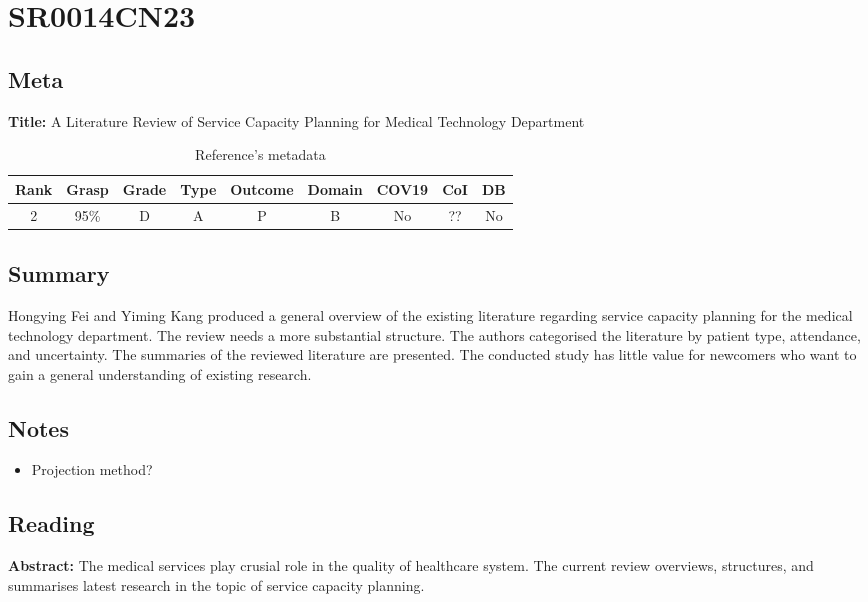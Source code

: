 \section{ SR0014CN23 }


\subsection{Meta}

    \textbf{Title:}
    A Literature Review of Service Capacity Planning for Medical Technology Department

    \begin{table}[H]
        \centering
        \begin{tabular}{|c|c|c|c|c|c|c|c|c|}
            \hline
                \textbf{Rank} & \textbf{Grasp} & \textbf{Grade} & \textbf{Type} & \textbf{Outcome} & \textbf{Domain} & \textbf{COV19} & \textbf{CoI} & \textbf{DB} \\
            \hline
                2 & 95\% & D & A & P & B & No & ?? & No \\
            \hline
        \end{tabular}
        \caption{Reference's metadata}
        \label{tab:SR0014CN23}
    \end{table}

\subsection{Summary}
    Hongying Fei and Yiming Kang\cite{x243} produced a general overview of the existing literature regarding service capacity planning for the medical technology department. The review needs a more substantial structure. The authors categorised the literature by patient type, attendance, and uncertainty. The summaries of the reviewed literature are presented. The conducted study has little value for newcomers who want to gain a general understanding of existing research.

\subsection{Notes}
    \begin{itemize}
        \item Projection method?
    \end{itemize}


\subsection{Reading}
    \textbf{Abstract:}
    The medical services play crusial role in the quality of healthcare system. The current review overviews, structures, and summarises latest research in the topic of service capacity planning.
    
